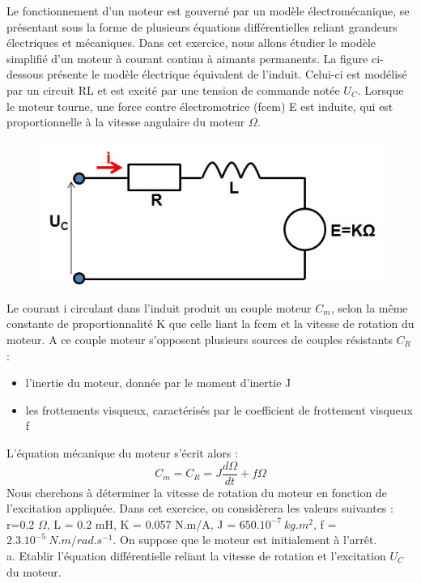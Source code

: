 \documentclass[11pt]{report}
\begin{document}
	Le fonctionnement d'un moteur est gouverné par un modèle électromécanique, se présentant sous la forme de plusieurs équations différentielles reliant grandeurs électriques et mécaniques. Dans cet exercice, nous allons étudier le modèle simplifié d'un moteur à courant continu à aimants permanents. La figure ci-dessous présente le modèle électrique équivalent de l'induit. Celui-ci est modélisé par un circuit RL et est excité par une tension de commande notée $U_{C}$. Lorsque le moteur tourne, une force contre électromotrice (fcem) E est induite, qui est proportionnelle à la vitesse angulaire du moteur $\Omega$. 
	\begin{figure}[h!]
		\centering
		\includegraphics[scale=0.5]{images/Exo3_moteur.jpg} 
	\end{figure}	
	Le courant i circulant dans l'induit produit un couple moteur $C_{m}$, selon la même constante de proportionnalité K que celle liant la fcem et la vitesse de rotation du moteur. A ce couple moteur s'opposent plusieurs sources de couples résistants $C_{R}$ :
	\begin{itemize}
		\item l'inertie du moteur, donnée par le moment d'inertie J
		\item les frottements visqueux, caractérisés par le coefficient de frottement visqueux f
	\end{itemize}
	L'équation mécanique du moteur s'écrit alors :
	\begin{equation*}
		C_{m} = C_{R} = J\frac{d\Omega}{dt}+f\Omega
	\end{equation*}	
	Nous cherchons à déterminer la vitesse de rotation du moteur en fonction de l'excitation appliquée.
	Dans cet exercice, on considèrera les valeurs suivantes : r=0.2 $\Omega$, L = 0.2 mH, K = 0.057 N.m/A, J = $650.10^{-7}~kg.m^{2}$, f = $2.3.10^{-5}~N.m/rad.s^{-1}$. On suppose que le moteur est initialement à l'arrêt.\\
	
	
	a. Etablir l'équation différentielle reliant la vitesse de rotation et l'excitation $U_{C}$ du moteur.
	
\end{document}
